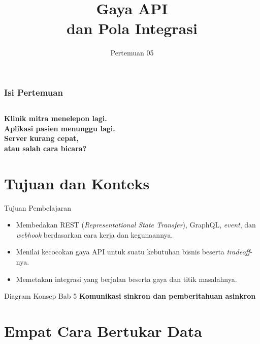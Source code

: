 \documentclass[aspectratio=169, table, 12pt]{beamer}
\title{\Huge Gaya API\\ \vspace{10pt} dan Pola Integrasi}
\date{Pertemuan 05}
\begin{document}
\frame{\titlepage}

\begin{frame}
  \frametitle{Isi Pertemuan}
  \vspace{14pt}
  \begin{columns}[t]
    {\small\tableofcontents[sections={1-4}]}

    {\small\tableofcontents[sections={5-9}]}
  \end{columns}
\end{frame}

\begin{frame}{\hfill}
  \centering
  \Huge{\textbf{Klinik mitra menelepon lagi.\\Aplikasi pasien menunggu lagi.\\Server kurang cepat,\\atau salah cara bicara?}}
\end{frame}

\section{Tujuan dan Konteks}

\begin{frame}{{\Large Tujuan Pembelajaran}}
  \vspace{10pt}
  \begin{itemize}
    \item Membedakan REST (\textit{Representational State Transfer}), GraphQL, \textit{event}, dan \textit{webhook} berdasarkan cara kerja dan kegunaannya.
    \item Menilai kecocokan gaya API untuk suatu kebutuhan bisnis beserta \textit{tradeoff}-nya.
    \item Memetakan integrasi yang berjalan beserta gaya dan titik masalahnya.
  \end{itemize}
\end{frame}

\begin{frame}{{\Large Diagram Konsep Bab 5}}
  \centering
  {\small\bfseries Komunikasi sinkron dan pemberitahuan asinkron}\par\medskip
\end{frame}

\section{Empat Cara Bertukar Data}
\end{document}

